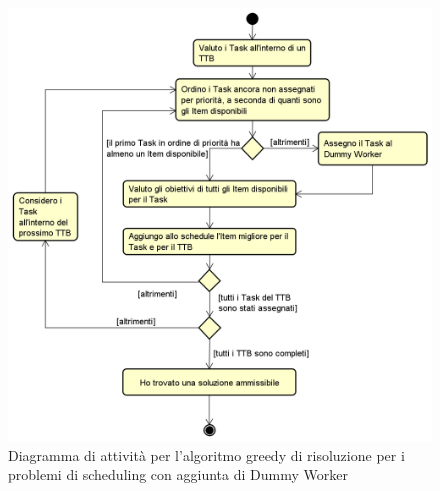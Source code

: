\begin{figure}[!h]
    \label{fig32}
    \begin{widepage}
        \includegraphics[width=16cm,keepaspectratio]{../immagini/algoritmo_dummy.png}
        \caption{Diagramma di attività per l'algoritmo greedy di risoluzione per i problemi di scheduling con aggiunta di Dummy Worker}
    \end{widepage}
\end{figure}